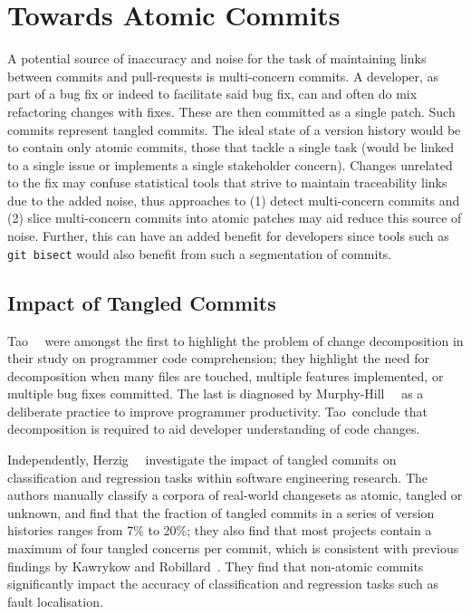 \section{Towards Atomic Commits}
\label{chapter:literature:sec:flexeme_rel_work}

A potential source of inaccuracy and noise for the task of maintaining links
between commits and pull-requests is multi-concern commits. A developer, as part
of a bug fix or indeed to facilitate said bug fix, can and often do mix
refactoring changes with fixes. These are then committed as a single
patch. Such commits represent tangled commits. The ideal state of a version
history would be to contain only atomic commits, \ie those that tackle a single
task (would be linked to a single issue or implements a single stakeholder
concern). Changes unrelated to the fix may confuse statistical tools that strive
to maintain traceability links due to the added noise, thus approaches to (1)
detect multi-concern commits and (2) slice multi-concern commits into atomic
patches may aid reduce this source of noise. Further, this can have an added
benefit for developers since tools such as \lstinline+git bisect+ would also
benefit from such a segmentation of commits.

\subsection{Impact of Tangled Commits}
\label{chapter:literature:sec:flexeme_rel_work:impact}

Tao~\etal~\cite{Tao2012} were amongst the first to highlight the problem of
change decomposition in their study on programmer code comprehension; they
highlight the need for decomposition when many files are touched, multiple
features implemented, or multiple bug fixes committed. The last is diagnosed by
Murphy-Hill~\etal~\cite{Murphy-Hill2012} as a deliberate practice to improve
programmer productivity. Tao~\etal conclude that decomposition is required to
aid developer understanding of code changes.

Independently, Herzig~\etal~\cite{Herzig2013, Herzig2016} investigate the impact
of tangled commits on classification and regression tasks within software
engineering research. The authors manually classify a corpora of real-world
changesets as atomic, tangled or unknown, and find that the fraction of tangled
commits in a series of version histories ranges from 7\% to 20\%; they also find
that most projects contain a maximum of four tangled concerns per commit, which
is  consistent with previous findings by Kawrykow and
Robillard~\cite{Kawrykow2011}. They find that non-atomic commits
significantly impact the accuracy of classification and regression tasks such as
fault localisation.

